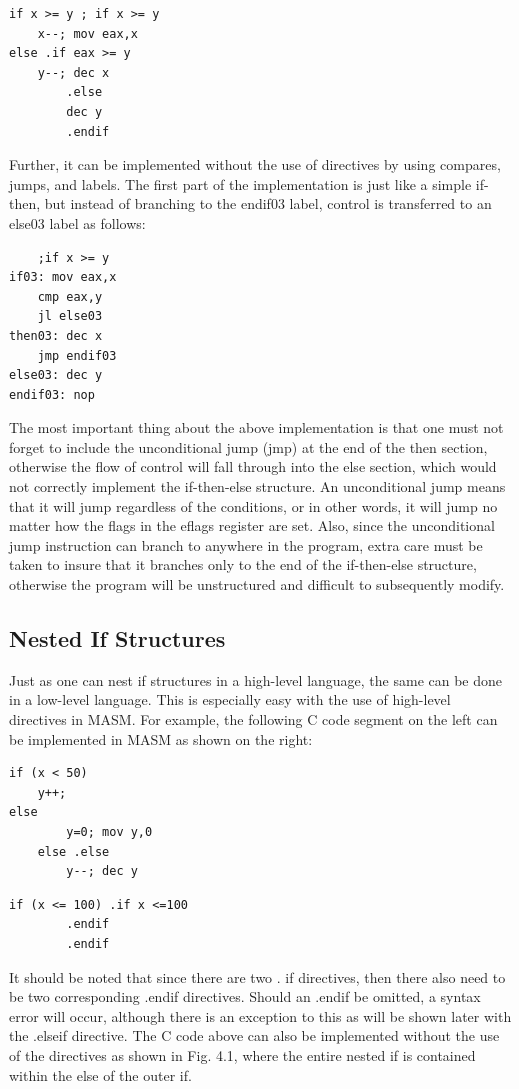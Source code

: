 \documentclass[10pt]{article}
\begin{document}
\begin{verbatim}
if x >= y ; if x >= y
    x--; mov eax,x
else .if eax >= y
    y--; dec x
        .else
        dec y
        .endif
\end{verbatim}

Further, it can be implemented without the use of directives by using compares, jumps, and labels. The first part of the implementation is just like a simple if-then, but instead of branching to the endif03 label, control is transferred to an else03 label as follows:

\begin{verbatim}
    ;if x >= y
if03: mov eax,x
    cmp eax,y
    jl else03
then03: dec x
    jmp endif03
else03: dec y
endif03: nop
\end{verbatim}

The most important thing about the above implementation is that one must not forget to include the unconditional jump (jmp) at the end of the then section, otherwise the flow of control will fall through into the else section, which would not correctly implement the if-then-else structure. An unconditional jump means that it will jump regardless of the conditions, or in other words, it will jump no matter how the flags in the eflags register are set. Also, since the unconditional jump instruction can branch to anywhere in the program, extra care must be taken to insure that it branches only to the end of the if-then-else structure, otherwise the program will be unstructured and difficult to subsequently modify.

\subsection*{Nested If Structures}
Just as one can nest if structures in a high-level language, the same can be done in a low-level language. This is especially easy with the use of high-level directives in MASM. For example, the following C code segment on the left can be implemented in MASM as shown on the right:

\begin{verbatim}
if (x < 50)
    y++;
else
        y=0; mov y,0
    else .else
        y--; dec y
\end{verbatim}

\begin{verbatim}
if (x <= 100) .if x <=100
        .endif
        .endif
\end{verbatim}

It should be noted that since there are two . if directives, then there also need to be two corresponding .endif directives. Should an .endif be omitted, a syntax error will occur, although there is an exception to this as will be shown later with the .elseif directive. The C code above can also be implemented without the use of the directives as shown in Fig. 4.1, where the entire nested if is contained within the else of the outer if.
\end{document}
